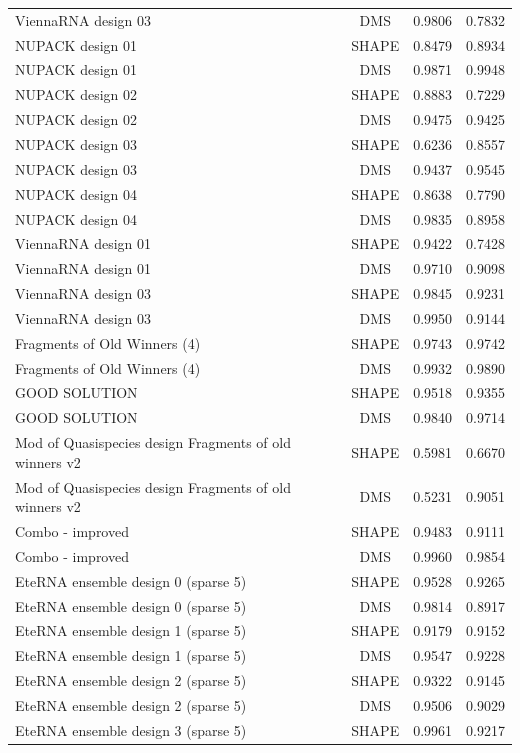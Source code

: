 \documentclass[letter]{bioinfo}
\begin{document}
\begin{center}
\begin{longtable}{lccc}
ViennaRNA design 03	&	DMS	&	0.9806 	&	0.7832 	\\
NUPACK design 01	&	SHAPE	&	0.8479 	&	0.8934 	\\
NUPACK design 01	&	DMS	&	0.9871 	&	0.9948 	\\
NUPACK design 02	&	SHAPE	&	0.8883 	&	0.7229 	\\
NUPACK design 02	&	DMS	&	0.9475 	&	0.9425 	\\
NUPACK design 03	&	SHAPE	&	0.6236 	&	0.8557 	\\
NUPACK design 03	&	DMS	&	0.9437 	&	0.9545 	\\
NUPACK design 04	&	SHAPE	&	0.8638 	&	0.7790 	\\
NUPACK design 04	&	DMS	&	0.9835 	&	0.8958 	\\
ViennaRNA design 01	&	SHAPE	&	0.9422 	&	0.7428 	\\
ViennaRNA design 01	&	DMS	&	0.9710 	&	0.9098 	\\
ViennaRNA design 03	&	SHAPE	&	0.9845 	&	0.9231 	\\
ViennaRNA design 03	&	DMS	&	0.9950 	&	0.9144 	\\
Fragments of Old Winners (4)	&	SHAPE	&	0.9743 	&	0.9742 	\\
Fragments of Old Winners (4)	&	DMS	&	0.9932 	&	0.9890 	\\
GOOD SOLUTION	&	SHAPE	&	0.9518 	&	0.9355 	\\
GOOD SOLUTION	&	DMS	&	0.9840 	&	0.9714 	\\
Mod of Quasispecies design Fragments of old winners v2	&	SHAPE	&	0.5981 	&	0.6670 	\\
Mod of Quasispecies design Fragments of old winners v2	&	DMS	&	0.5231 	&	0.9051 	\\
Combo - improved	&	SHAPE	&	0.9483 	&	0.9111 	\\
Combo - improved	&	DMS	&	0.9960 	&	0.9854 	\\
EteRNA ensemble design 0 (sparse 5)	&	SHAPE	&	0.9528 	&	0.9265 	\\
EteRNA ensemble design 0 (sparse 5)	&	DMS	&	0.9814 	&	0.8917 	\\
EteRNA ensemble design 1 (sparse 5)	&	SHAPE	&	0.9179 	&	0.9152 	\\
EteRNA ensemble design 1 (sparse 5)	&	DMS	&	0.9547 	&	0.9228 	\\
EteRNA ensemble design 2 (sparse 5)	&	SHAPE	&	0.9322 	&	0.9145 	\\
EteRNA ensemble design 2 (sparse 5)	&	DMS	&	0.9506 	&	0.9029 	\\
EteRNA ensemble design 3 (sparse 5)	&	SHAPE	&	0.9961 	&	0.9217 	\\

\end{longtable}
\end{center}
\end{document}
